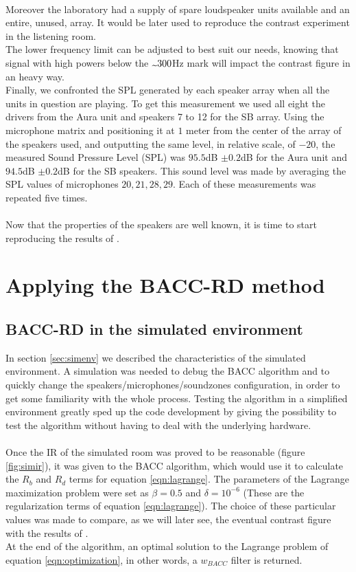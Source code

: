 \\
Moreover the laboratory had a supply of spare loudspeaker units available and an entire, unused, array. It would be later used to reproduce the contrast experiment in the listening room.
\\
The lower frequency limit can be adjusted to best suit our needs, knowing that signal with high powers below the $\tld 300$Hz mark will impact the contrast figure in an heavy way.
\\
Finally, we confronted the SPL generated by each speaker array when all the units in question are playing.
To get this measurement we used all eight the drivers from the Aura unit and speakers 7 to 12 for the SB array. Using the microphone matrix and positioning it at $1$ meter from the center of the array of the speakers used, and outputting the same level, in relative scale, of $-20$, the measured Sound Pressure Level (SPL) was $95.5$dB $\pm0.2$dB for the Aura unit and $94.5$dB $\pm0.2$dB for the SB speakers. This sound level was made by averaging the SPL values of microphones $20, 21, 28, 29$. Each of these measurements was repeated five times.
\\
\\
Now that the properties of the speakers are well known, it is time to start reproducing the results of \parencite{cai_time-domain_2014}.


\section{Applying the BACC-RD method}{}
\label{sec:baccrd}

\subsection{BACC-RD in the simulated environment}{}
\label{subsec:baccrdsim}

In section \ref{sec:simenv} we described the characteristics of the simulated environment. A simulation was needed to debug the BACC algorithm and to quickly change the speakers/microphones/soundzones configuration, in order to get some familiarity with the whole process. Testing the algorithm in a simplified environment greatly sped up the code development by giving the possibility to test the algorithm without having to deal with the underlying hardware. 
\\
\\
Once the IR of the simulated room was proved to be reasonable (figure \ref{fig:simir}), it was given to the BACC algorithm, which would use it to calculate the $R_b$ and $R_d$ terms for equation \ref{eqn:lagrange}. The parameters of the Lagrange maximization problem were set as $\beta = 0.5$ and $\delta = 10^{-6}$ (These are the regularization terms of equation \ref{eqn:lagrange}). The choice of these particular values was made to compare, as we will later see, the eventual contrast figure with the results of \parencite{cai_time-domain_2014}.
\\
At the end of the algorithm, an optimal solution to the Lagrange problem  of equation \ref{eqn:optimization}, in other words, a $w_{BACC}$ filter is returned.

